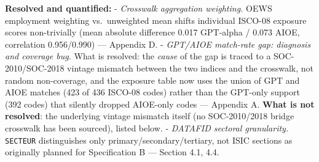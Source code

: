 \documentclass[
  11pt,
]{article}
\begin{document}
\textbf{Resolved and quantified:} - \emph{Crosswalk aggregation
weighting.} OEWS employment weighting vs.~unweighted mean shifts
individual ISCO-08 exposure scores non-trivially (mean absolute
difference 0.017 GPT-alpha / 0.073 AIOE, correlation 0.956/0.990) ---
Appendix D. - \emph{GPT/AIOE match-rate gap: diagnosis and coverage
bug.} What is resolved: the \emph{cause} of the gap is traced to a
SOC-2010/SOC-2018 vintage mismatch between the two indices and the
crosswalk, not random non-coverage, and the exposure table now uses the
union of GPT and AIOE matches (423 of 436 ISCO-08 codes) rather than the
GPT-only support (392 codes) that silently dropped AIOE-only codes ---
Appendix A. \textbf{What is not resolved}: the underlying vintage
mismatch itself (no SOC-2010/2018 bridge crosswalk has been sourced),
listed below. - \emph{DATAFID sectoral granularity.} \texttt{SECTEUR}
distinguishes only primary/secondary/tertiary, not ISIC sections as
originally planned for Specification B --- Section 4.1, 4.4.
\end{document}
